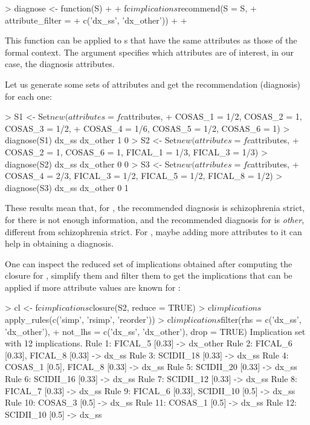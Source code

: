 \begin{example}
> diagnose <- function(S) {
+
+   fc$implications$recommend(S = S,
+                             attribute_filter =
+                               c('dx_ss', 'dx_other'))
+
+ }
\end{example}

This function can be applied to s that have the same
attributes as those of the formal context. The 
argument specifies which attributes are of interest, in our case, the
diagnosis attributes.

Let us generate some sets of attributes and get the recommendation
(diagnosis) for each one:

\begin{example}
> S1 <- Set$new(attributes = fc$attributes,
+               COSAS_1 = 1/2, COSAS_2 = 1, COSAS_3 = 1/2,
+               COSAS_4 = 1/6, COSAS_5 = 1/2, COSAS_6 = 1)
> diagnose(S1)
   dx_ss dx_other
       1        0
> S2 <- Set$new(attributes = fc$attributes,
+               COSAS_2 = 1, COSAS_6 = 1, FICAL_1 = 1/3, FICAL_3 = 1/3)
> diagnose(S2)
   dx_ss dx_other
       0        0
> S3 <- Set$new(attributes = fc$attributes,
+               COSAS_4 = 2/3, FICAL_3 = 1/2, FICAL_5 = 1/2, FICAL_8 = 1/2)
> diagnose(S3)
   dx_ss dx_other
       0        1
\end{example}

These results mean that, for , the recommended diagnosis is
schizophrenia strict, for  there is not enough information, and
the recommended diagnosis for  is \emph{other}, different from
schizophrenia strict. For , maybe adding more attributes to it
can help in obtaining a diagnosis.

One can inspect the reduced set of implications obtained after computing
the closure for , simplify them and filter them to get the
implications that can be applied if more attribute values are known for
:

\begin{example}
> cl <- fc$implications$closure(S2, reduce = TRUE)
> cl$implications$apply_rules(c('simp', 'rsimp', 'reorder'))
> cl$implications$filter(rhs = c('dx_ss', 'dx_other'),
+                        not_lhs = c('dx_ss', 'dx_other'), drop = TRUE)
Implication set with 12 implications.
Rule 1: {FICAL_5 [0.33]} -> {dx_other}
Rule 2: {FICAL_6 [0.33], FICAL_8 [0.33]} -> {dx_ss}
Rule 3: {SCIDII_18 [0.33]} -> {dx_ss}
Rule 4: {COSAS_1 [0.5], FICAL_8 [0.33]} -> {dx_ss}
Rule 5: {SCIDII_20 [0.33]} -> {dx_ss}
Rule 6: {SCIDII_16 [0.33]} -> {dx_ss}
Rule 7: {SCIDII_12 [0.33]} -> {dx_ss}
Rule 8: {FICAL_7 [0.33]} -> {dx_ss}
Rule 9: {FICAL_6 [0.33], SCIDII_10 [0.5]} -> {dx_ss}
Rule 10: {COSAS_3 [0.5]} -> {dx_ss}
Rule 11: {COSAS_1 [0.5]} -> {dx_ss}
Rule 12: {SCIDII_10 [0.5]} -> {dx_ss}
\end{example}

